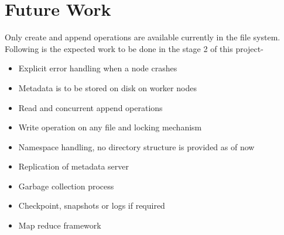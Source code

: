 \documentclass[a4paper,12pt]{article}
\begin{document}
\section{Future Work}
Only create and append operations are available currently in the file system. Following is the expected work to be done in the stage 2 of this project-
\begin{itemize}
\item Explicit error handling when a node crashes
\item Metadata is to be stored on disk on worker nodes
\item Read and concurrent append operations
\item Write operation on any file and locking mechanism
\item Namespace handling, no directory structure is provided as of now
\item Replication of metadata server
\item Garbage collection process
\item Checkpoint, snapshots or logs if required
\item Map reduce framework
\end{itemize}
\end{document}
